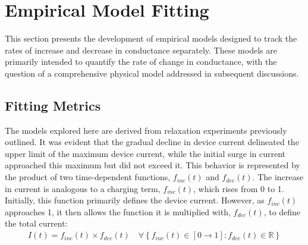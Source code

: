 \section[Empirical Model Fitting]{Empirical Model Fitting}


This section presents the development of empirical models designed to track the rates of increase and decrease in conductance separately. These models are primarily intended to quantify the rate of change in conductance, with the question of a comprehensive physical model addressed in subsequent discussions.

\subsection[Fitting Metrics]{Fitting Metrics}




\noindent The models explored here are derived from relaxation experiments previously outlined. It was evident that the gradual decline in device current delineated the upper limit of the maximum device current, while the initial surge in current approached this maximum but did not exceed it. This behavior is represented by the product of two time-dependent functions, $f_{inc}(t)$ and $f_{dec}(t)$. The increase in current is analogous to a charging term, $f_{inc}(t)$, which rises from 0 to 1. Initially, this function primarily defines the device current. However, as  $f_{inc}(t)$ approaches 1, it then allows the function it is multiplied with, $f_{dec}(t)$, to define the total current:
\begin{align}
    I(t) = f_{inc}(t) \times f_{dec}(t) \quad \forall \left\{ f_{inc}(t) \in [0 \to 1] : f_{dec}(t) \in \mathbb{R} \right\} \label{eq:5.1}
\end{align}

